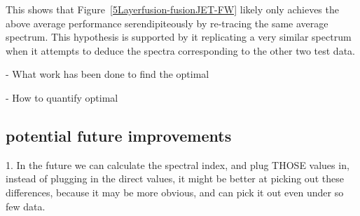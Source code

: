 \documentclass[a4paper, 12pt]{article}
\newcommand{\fluenceandactivities}[1]{
\texttt{[image: \#1fluence.png]}
\texttt{[image: \#1activities.png]}
}
\begin{document}
This shows that Figure~\ref{5Layerfusion-fusionJET-FW} likely only achieves the above average performance serendipiteously by re-tracing the same average spectrum. This hypothesis is supported by it replicating a very similar spectrum when it attempts to deduce the spectra corresponding to the other two test data.





- What work has been done to find the optimal

- How to quantify optimal

\subsection{potential future improvements}
1. In the future we can calculate the spectral index, and plug THOSE values in, instead of plugging in the direct values, it might be better at picking out these differences, because it may be more obvious, and can pick it out even under so few data.
\end{document}
